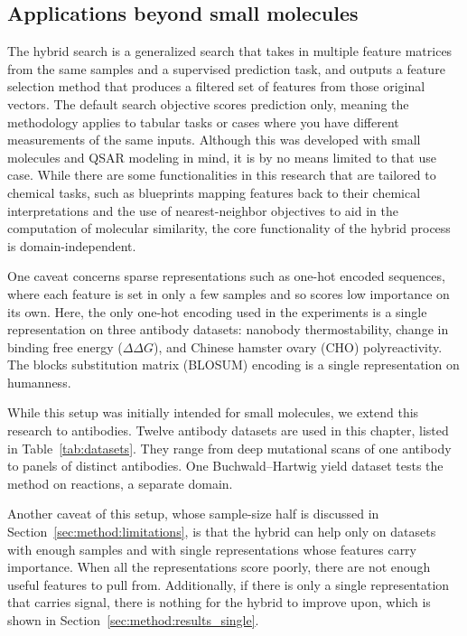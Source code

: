 \subsection{Applications beyond small molecules}

The hybrid search is a generalized search that takes in multiple feature matrices from the same samples and a supervised prediction task, and outputs a feature selection method that produces a filtered set of features from those original vectors. The default search objective scores prediction only, meaning the methodology applies to tabular tasks or cases where you have different measurements of the same inputs. Although this was developed with small molecules and QSAR modeling in mind, it is by no means limited to that use case. While there are some functionalities in this research that are tailored to chemical tasks, such as blueprints mapping features back to their chemical interpretations and the use of nearest-neighbor objectives to aid in the computation of molecular similarity, the core functionality of the hybrid process is domain-independent.


One caveat concerns sparse representations such as one-hot encoded sequences, where each feature is set in only a few samples and so scores low importance on its own.
Here, the only one-hot encoding used in the experiments is a single representation on three antibody datasets: nanobody thermostability, change in binding free energy ($\Delta\Delta G$), and Chinese hamster ovary (CHO) polyreactivity. The blocks substitution matrix (BLOSUM) encoding is a single representation on humanness.

While this setup was initially intended for small molecules, we extend this research to antibodies. 
Twelve antibody datasets are used in this chapter, listed in Table~\ref{tab:datasets}. They range from deep mutational scans of one antibody to panels of distinct antibodies. One Buchwald--Hartwig yield dataset tests the method on reactions, a separate domain.  

Another caveat of this setup, whose sample-size half is discussed in Section~\ref{sec:method:limitations}, is that the hybrid can help only on datasets with enough samples and with single representations whose features carry importance. When all the representations score poorly, there are not enough useful features to pull from. Additionally, if there is only a single representation that carries signal, there is nothing for the hybrid to improve upon, which is shown in Section~\ref{sec:method:results_single}.

